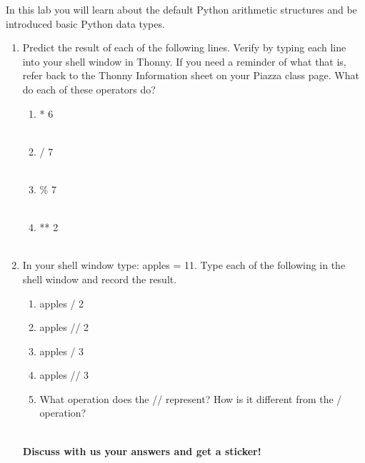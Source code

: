 \documentclass[11pt, letterpaper, onecolumn, oneside, final]{article}
\begin{document}
\maketitle

 In this lab you will learn about the default Python arithmetic structures and be introduced basic Python data types.
\begin{enumerate}
\item Predict the result of each of the following lines. Verify by typing each line into your shell window in Thonny. If you need a reminder of what that is, refer back to the Thonny Information sheet on your Piazza class page. What do each of these operators do? 
\begin{enumerate}
    \item { * 6}\\
    \\
    \item { / 7}\\
    \\
    \item { \% 7}\\
    \\
    \item { ** 2}\\
    \\
\end{enumerate}
\item In your shell window type: {\consolas apples = 11}. Type each of the following in the shell window and record the result.

\begin{enumerate}
    \item {\consolas apples / 2}
    \item {\consolas apples // 2}
    \item {\consolas apples / 3}
    \item {\consolas apples // 3}
    \item What operation does the {\consolas //}  represent? How is it different from the {\consolas /} operation?\\
    \\
\end{enumerate}
\textbf{Discuss with us your answers and get a sticker!}


\end{enumerate}
\end{document}
